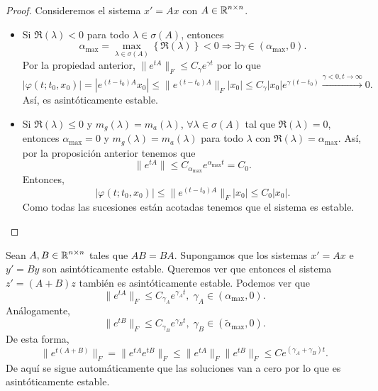 \begin{proof}
	Consideremos el sistema $\displaystyle x '= Ax $ con $\displaystyle A \in \mathbb{R} ^{n \times n} $. 
\begin{itemize}
\item Si $\displaystyle \Re\left(\lambda \right)<0 $ para todo $\displaystyle \lambda \in \sigma\left(A\right) $, entonces 
	\[\alpha_{\max }=\max _{\lambda \in \sigma\left(A\right)} \left\{ \Re\left(\lambda \right)\right\} <0 \Rightarrow \exists \gamma \in \left(\alpha_{\max }, 0\right) .\]
Por la propiedad anterior, $\displaystyle \|e^{tA}\|_{F}\leq C_{\gamma }e^{\gamma t} $ por lo que 
\[ \left|\varphi\left(t; t_{0}, x_{0}\right)\right| = \left|e^{\left(t-t_{0}\right)A}x_{0}\right|\leq \|e^{\left(t-t_{0}\right)A}\|_{F} \left|x_{0}\right| \leq C_{\gamma } \left|x_{0}\right|e^{\gamma\left(t-t_{0}\right)} \xrightarrow{\gamma < 0, t \to \infty }0 .\]
Así, es asintóticamente estable. 
\item Si $\displaystyle \Re\left(\lambda \right)\leq 0 $ y $\displaystyle m_{g}\left(\lambda \right) = m_{a}\left(\lambda \right) $, $\displaystyle \forall \lambda \in \sigma\left(A\right) $ tal que $\displaystyle \Re\left(\lambda \right)=0 $, entonces $\displaystyle \alpha_{\max }=0 $ y $\displaystyle m_{g}\left(\lambda \right)=m_{a}\left(\lambda \right) $ para todo $\displaystyle \lambda  $ con $\displaystyle \Re\left(\lambda \right)=\alpha_{\max } $. 
Así, por la proposición anterior tenemos que 
\[\|e^{tA}\| \leq C_{\alpha_{\max }}e^{\alpha_{\max }t} = C_{0} .\]
Entonces, 
\[ \left|\varphi\left(t; t_{0}, x_{0}\right)\right|\leq \|e^{\left(t-t_{0}\right)A}\|_{F} \left|x_{0}\right| \leq C_{0} \left|x_{0}\right| .\]
Como todas las sucesiones están acotadas tenemos que el sistema es estable. 
\end{itemize}
\end{proof}
\begin{eg}[Problema 20]
Sean $\displaystyle A,B \in \mathbb{R}^{n \times n} $ tales que $\displaystyle AB = BA $. Supongamos que los sistemas $\displaystyle x ' = Ax $ e $\displaystyle y' = By $ son asintóticamente estable. Queremos ver que entonces el sistema $\displaystyle z' = \left(A + B\right)z $ también es asintóticamente estable. Podemos ver que
\[\|e^{tA}\|_{F} \leq C_{\gamma_{A}}e^{\gamma_{A}t}, \; \gamma_{A}\in \left(\alpha_{\max }, 0\right) .\]
Análogamente, 
\[ \|e^{tB}\|_{F} \leq C_{\gamma_{B}}e^{\gamma_{B}t}, \; \gamma_{B}\in \left(\tilde{\alpha}_{\max }, 0\right) .\]
De esta forma, 
\[ \|e^{t\left(A + B\right)}\|_{F} = \|e^{tA}e^{tB}\|_{F} \leq \|e^{tA}\|_{F}\|e^{tB}\|_{F} \leq Ce^{\left(\gamma_{A} + \gamma_{B}\right)t} .\]
De aquí se sigue automáticamente que las soluciones van a cero por lo que es asintóticamente estable. 
\end{eg}
